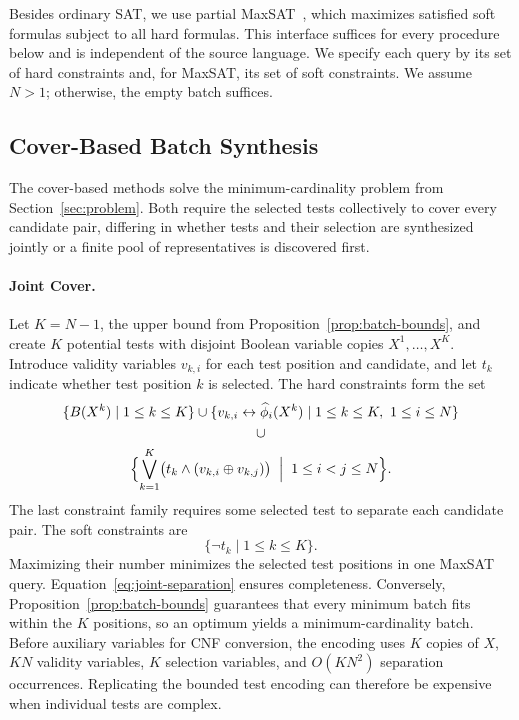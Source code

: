 \documentclass[runningheads]{llncs}
\newcommand{\methodname}[1]{\textup{\textsf{#1}}}
\newcommand{\jointcover}{\methodname{Joint Cover}}
\begin{document}
Besides ordinary SAT, we use partial MaxSAT~\cite{cha1997local}, which maximizes
satisfied soft formulas subject to all hard formulas. This interface suffices
for every procedure below and is independent of the source language.
We specify each query by its set of hard constraints and, for MaxSAT, its
set of soft constraints.
We assume $N>1$; otherwise, the empty batch suffices.

\subsection{Cover-Based Batch Synthesis}
\label{sec:cover-based-synthesis}

The cover-based methods solve the minimum-cardinality problem from
Section~\ref{sec:problem}. Both require the selected tests collectively to
cover every candidate pair, differing in whether tests and their selection
are synthesized jointly or a finite pool of representatives is discovered
first.

\paragraph{\jointcover{}.}
Let $K=N-1$, the upper bound from Proposition~\ref{prop:batch-bounds}, and
create $K$ potential tests with disjoint Boolean variable copies $X^1,\ldots,X^K$.
Introduce validity variables $v_{k,i}$ for each test position and candidate,
and let $t_k$ indicate whether test position $k$ is selected. The hard constraints
form the set
\begin{equation}
\label{eq:joint-separation}
\begin{gathered}
  \{B(X^k)\mid 1\leq k\leq K\}
    \cup\{v_{k,i}\leftrightarrow\widehat{\phi}_i(X^k)
    \mid 1\leq k\leq K,\ 1\leq i\leq N\}\\
  \cup\\
  \Bigl\{\bigvee_{k=1}^{K}\bigl(t_k\land(v_{k,i}\oplus v_{k,j})\bigr)
    \;\Bigm|\;1\leq i<j\leq N\Bigr\}.
\end{gathered}
\end{equation}
The last constraint family requires some selected test to separate each candidate pair.
The soft constraints are
\begin{equation}
\label{eq:joint-objective}
  \{\neg t_k\mid 1\leq k\leq K\}.
\end{equation}
Maximizing their number minimizes the selected test positions in one MaxSAT
query. Equation~\eqref{eq:joint-separation} ensures completeness. Conversely,
Proposition~\ref{prop:batch-bounds} guarantees that every minimum batch fits
within the $K$ positions, so an optimum yields a minimum-cardinality batch.
Before auxiliary variables for CNF conversion, the encoding uses $K$ copies
of $X$, $KN$ validity variables, $K$ selection variables, and $O(KN^2)$
separation occurrences. Replicating the bounded test encoding can therefore
be expensive when individual tests are complex.
\end{document}
